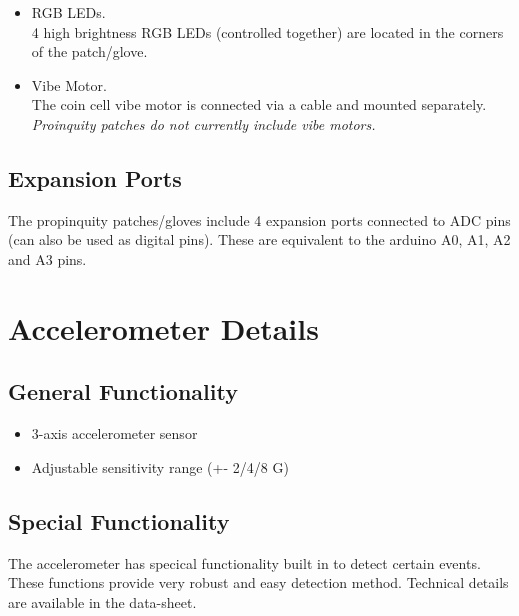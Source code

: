 \documentclass{article}
\begin{document}
\begin{itemize}[noitemsep,nolistsep]
	\item RGB LEDs. \\ 4 high brightness RGB LEDs (controlled together) are located in the corners of the patch/glove.
	\item Vibe Motor. \\ The coin cell vibe motor is connected via a cable and mounted separately. \\ {\em Proinquity patches do not currently include vibe motors.}
\end{itemize}

\subsection*{Expansion Ports}

The propinquity patches/gloves include 4 expansion ports connected to ADC pins (can also be used as digital pins). These are equivalent to the arduino A0, A1, A2 and A3 pins.

\pagebreak

\section*{Accelerometer Details}

\subsection*{General Functionality}

\begin{itemize}[noitemsep,nolistsep]
	\item 3-axis accelerometer sensor
	\item Adjustable sensitivity range (+- 2/4/8 G)
\end{itemize}

\subsection*{Special Functionality}

The accelerometer has specical functionality built in to detect certain events. These functions provide very robust and easy detection method. Technical details are available in the data-sheet.
\end{document}
